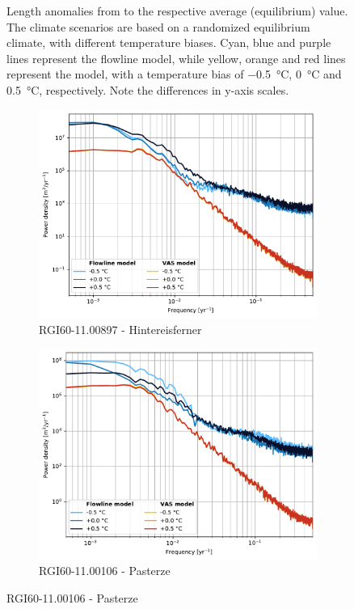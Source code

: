 \begin{figure}[htp]
        \caption{Length anomalies from to the respective average (equilibrium) value. The climate scenarios are based on a randomized equilibrium climate, with different temperature biases. Cyan, blue and purple lines represent the flowline model, while yellow, orange and red lines represent the \vas{} model, with a temperature bias of \SI{-.5}{\celsius}, \SI{0}{\celsius} and \SI{+.5}{\celsius}, respectively. Note the differences in y-axis scales.}
        \label{fig:random_length} 
      \end{figure}
      
      \begin{figure}[htp]
        \centering
        \begin{subfigure}[b]{0.48\textwidth}
          \caption{RGI60-11.00897 - Hintereisferner}
          \label{fig:psd:hintereisferner}
          \centering
          \includegraphics[width=\textwidth]{../plots/final_plots/psd/Hintereisferner.pdf}
        \end{subfigure}
        \hfill
        \begin{subfigure}[b]{0.48\textwidth}
          \caption{RGI60-11.00106 - Pasterze}
          \label{fig:psd:pasterze}
          \centering
          \includegraphics[width=\textwidth]{../plots/final_plots/psd/Pasterze.pdf}

\end{subfigure}
\end{figure}
